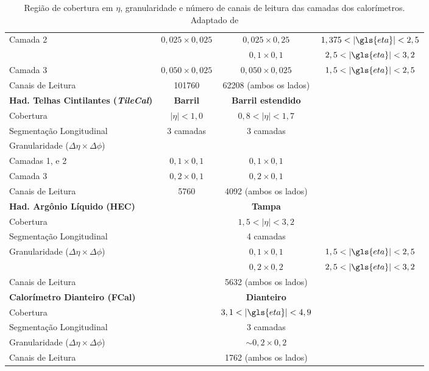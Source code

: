 \begin{table}[p]
{\begin{tabular}{p{5cm} c c c}
  Camada 2  & $0,025 \times 0,025$ & $0,025 \times 0,25$   & $1,375 <
|\gls{eta}| < 2,5$ \\
            &                      & $0,1 \times 0,1$      & $2,5   <
|\gls{eta}| < 3,2$ \\
  Camada 3  & $0,050 \times 0,025$ & $0,050 \times 0,025$  & $1,5   <
|\gls{eta}| < 2,5$ \\
  Canais de Leitura & 101760 & 62208 (ambos os lados)\\
   \hline
   \hline
  \textbf{Had. Telhas Cintilantes (\emph{TileCal})}    & \textbf{Barril}  & \textbf{Barril
estendido}     \\  \hline
  Cobertura   &  $|\eta|<1,0$ & $0,8<|\eta|<1,7$   \\
  Segmentação Longitudinal & 3 camadas  & 3 camadas  \\
  Granularidade ($\Delta \eta \times \Delta \phi$)& &  \\
  Camadas 1, e 2    &  $0,1 \times 0,1$ & $0,1 \times 0,1$   \\
  Camada 3   &  $0,2 \times 0,1$ & $0,2 \times 0,1$   \\
  Canais de Leitura & 5760 & 4092 (ambos os lados)\\
  \hline
  \hline
  \textbf{Had. Argônio Líquido (HEC)}    &  &  \textbf{Tampa}     \\  \hline
  Cobertura   &   & $1,5<|\eta|<3,2$  \\
  Segmentação Longitudinal &   & 4 camadas  \\
  Granularidade ($\Delta \eta \times \Delta \phi$)& & $0,1 \times 0,1 $ & $1,5 <
|\gls{eta}| < 2,5$ \\
  & & $0,2 \times 0,2 $ & $ 2,5 < |\gls{eta}| < 3,2$ \\
  Canais de Leitura & & 5632 (ambos os lados)\\
  \hline
  \hline
  \textbf{Calorímetro Dianteiro (FCal)}    &  &   \textbf{Dianteiro}    \\  \hline
  Cobertura   &  & $ 3,1 < |\gls{eta}| < 4,9 $ \\
  Segmentação Longitudinal &   & 3 camadas  \\
  Granularidade ($\Delta \eta \times \Delta \phi$)& & $\sim0,2 \times 0,2$  \\
  Canais de Leitura & & 1762 (ambos os lados)\\
  \hline
  \hline
\end{tabular}
}
\caption[Região de cobertura em $\eta$, granularidade e
número de canais de leitura das camadas dos calorímetros]
{Região de cobertura em $\eta$, granularidade e
número de canais de leitura das camadas dos calorímetros. Adaptado de
\cite{tese_eduardo}}
\vspace{.3cm}
\label{tab:calo}
\end{table}

